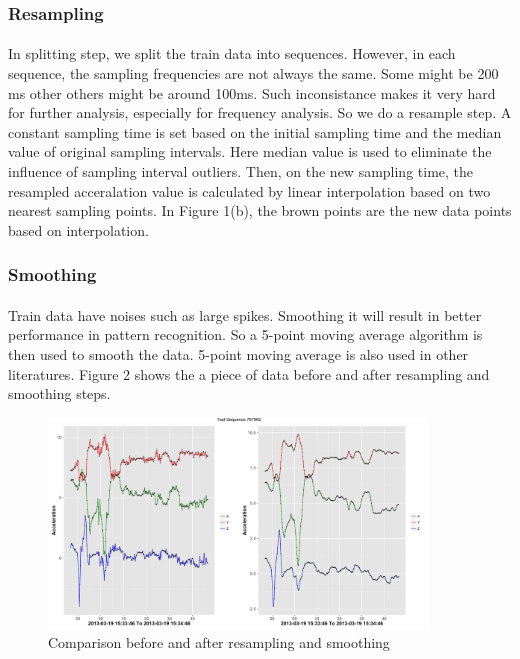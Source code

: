 \documentclass[11pt,letterpaper]{article}
\begin{document}
		\subsubsection{Resampling}
		\paragraph{} In splitting step, we split the train data into sequences. However, in each sequence, the sampling frequencies are not always the same. Some might be 200 ms other others might be around 100ms. Such inconsistance makes it very hard for further analysis, especially for frequency analysis. So we do a resample step. A constant sampling time is set based on the initial sampling time and the median value of original sampling intervals. Here median value is used to eliminate the influence of sampling interval outliers. Then, on the new sampling time, the resampled acceralation value is calculated by linear interpolation based on two nearest sampling points. In Figure 1(b), the brown points are the new data points based on interpolation. 
		\subsubsection{Smoothing}
		\paragraph{} Train data have noises such as large spikes. Smoothing it will result in better performance in pattern recognition. So a 5-point moving average algorithm is then used to smooth the data. 5-point moving average is also used in other literatures. Figure 2 shows the a piece of data before and after resampling and smoothing steps.
		\begin{figure}
			\centering
			\includegraphics[width=0.9\textwidth]{Rplot.pdf}
			\caption{Comparison before and after resampling and smoothing}
		\end{figure}
	
\end{document}
